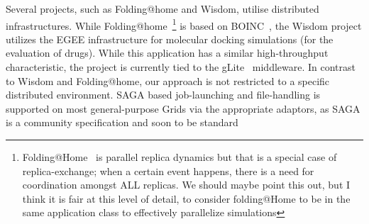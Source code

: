 \documentclass[conference,final]{IEEEtran}
\newcommand{\kimnote}[1]{ {\textcolor{green} { ***JK: #1 }}}
\newcommand{\amnote}[1]{ {\textcolor{magenta} { ***AM: #1 }}}
\newcommand{\jhanote}[1]{ {\textcolor{red} { ***SJ: #1 }}}
\newcommand{\kimnote}[1]{}
\newcommand{\amnote}[1]{}
\newcommand{\jhanote}[1]{}
\begin{document}
Several projects, such as Folding@home and Wisdom, utilise distributed
infrastructures. While
Folding@home~\cite{PhysRevLett.86.4983}\footnote{Folding@Home~\cite{PhysRevLett.86.4983}
  is parallel replica dynamics but that is a special case of
  replica-exchange; when a certain event happens, there is a need for
  coordination amongst ALL replicas. We should maybe point this out,
  but I think it is fair at this level of detail, to consider
  folding@Home to be in the same application class to effectively
  parallelize simulations} is based on BOINC~\cite{1033223}, the
Wisdom project utilizes the EGEE infrastructure for molecular docking
simulations (for the evaluation of drugs). While this application has
a similar high-throughput characteristic, the project is currently
tied to the gLite~\cite{glite} middleware.  In contrast to Wisdom
and Folding@home, our approach is not restricted to a specific
distributed environment. SAGA based job-launching and file-handling is
supported on most general-purpose Grids via the appropriate adaptors,
as SAGA is a community specification and soon to be
standard~\cite{saga_url}



\end{document}
